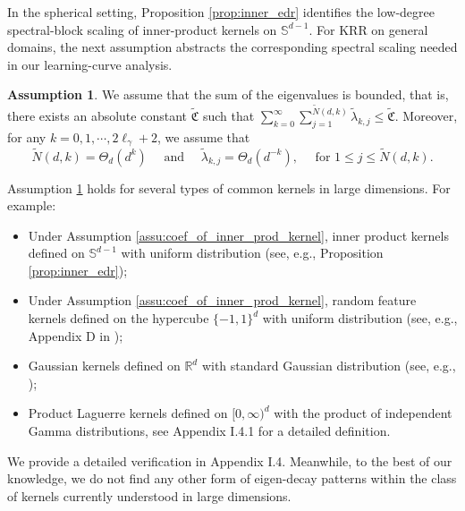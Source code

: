 \documentclass{article}
\theoremstyle{plain}
\theoremstyle{definition}
\newtheorem{assumption}{Assumption} %
\theoremstyle{remark}
\begin{document}
In the spherical setting, Proposition \ref{prop:inner_edr} identifies the low-degree spectral-block scaling of inner-product kernels on $\mathbb{S}^{d-1}$.
For KRR on general domains, the next assumption abstracts the corresponding spectral scaling needed in our learning-curve analysis.


\begin{assumption}\label{assump_eigenval_general}
    We assume that the sum of the eigenvalues is bounded, that is, there exists an absolute constant $\tilde{\mathfrak{C}}$ such that $\sum_{k=0}^{\infty} \sum_{j=1}^{\tilde{N}(d, k)} \tilde{\lambda}_{k, j}\leq \tilde{\mathfrak{C}}$. Moreover, for any $k  = 0, 1, \cdots, 2\ell_{\gamma} +2$, we assume that
    $$\tilde{N}(d, k) = \Theta_d(d^{k}) \quad \text{ and } \quad 
        \tilde{\lambda}_{k, j} = \Theta_d(d^{-k}), \quad \text{ for } 1\leq j \leq \tilde{N}(d, k).
    $$
\end{assumption}


Assumption \ref{assump_eigenval_general} holds for several types of common kernels in large dimensions. For example:
\begin{itemize}
    \item Under Assumption \ref{assu:coef_of_inner_prod_kernel}, inner product kernels defined on $\mathbb{S}^{d-1}$ with uniform distribution (see, e.g., Proposition \ref{prop:inner_edr});

    \item Under Assumption \ref{assu:coef_of_inner_prod_kernel}, random feature kernels defined on the hypercube $\{-1, 1\}^{d}$ with uniform distribution (see, e.g., Appendix D in \cite{mei2022generalization});

    \item Gaussian kernels defined on $\mathbb{R}^d$ with standard Gaussian distribution (see, e.g., \cite{rasmussen2003gaussian});

    \item Product Laguerre kernels defined on $[0, \infty)^{d}$ with the product of independent Gamma distributions, see Appendix I.4.1 for a detailed definition.
    
\end{itemize}

We provide a detailed
verification in Appendix I.4.
Meanwhile, to the best of our knowledge, we do not find any other form of eigen-decay patterns within the class of kernels currently understood in large dimensions. 
\end{document}
